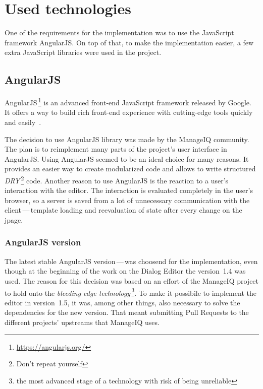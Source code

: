 \chapter{Used technologies}\label{ch:technologies}

One of the requirements for the implementation was to use the JavaScript
framework AngularJS. On top of that, to make the implementation easier,
a few extra JavaScript libraries were used in the project.

\section{AngularJS}

AngularJS\,\footnote{\url{https://angularjs.org/}} is an advanced front-end
JavaScript framework released by Google.
It offers a way to build rich front-end experience with cutting-edge
tools quickly and easily~\cite{Angular}.

The decision to use AngularJS library was made by the ManageIQ community.
The plan is to reimplement many parts of the project's user interface
in AngularJS.
Using AngularJS seemed to be an ideal choice for many reasons.
It provides an easier way to create modularized code and allows to write
structured {\it DRY}\,\footnote{Don't repeat yourself} code.
Another reason to use AngularJS is the reaction to a user's interaction with
the editor. The interaction is evaluated completely in the user's browser, so
a server is saved from a lot of unnecessary communication with the
client\,---\,template loading and reevaluation of state after every change
on the jpage.

\subsection{AngularJS version}

The latest stable AngularJS version\,---\,was choosend for the implementation,
even though at the beginning of the work on the Dialog Editor the version~1.4
was used. The reason for this decision was based on an
effort of the ManageIQ project to hold onto the {\it bleeding edge
technology}\,\footnote{the most advanced stage of a technology with risk of
being unreliable}.
To make it possibile to implement the editor in version~1.5, it was,
among other things, also necessary to solve the dependencies for the
new version.
That meant submitting Pull Requests to the different projects' upstreams that
ManageIQ uses.

\newpage

